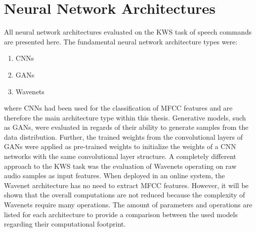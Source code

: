 
\section{Neural Network Architectures}\label{sec:nn_arch}
All neural network architectures evaluated on the KWS task of speech commands are presented here.
The fundamental neural network architecture types were:
\begin{enumerate}
	\item CNNs
	\item GANs
	\item Wavenets
\end{enumerate}
where CNNs had been used for the classification of MFCC features and are therefore the main architecture type within this thesis.
Generative models, such as GANs, were evaluated in regards of their ability to generate samples from the data distribution.
Further, the trained weights from the convolutional layers of GANs were applied as pre-trained weights to initialize the weights of a CNN networks with the same convolutional layer structure.
A completely different approach to the KWS task was the evaluation of Wavenets operating on raw audio samples as input features.
When deployed in an online system, the Wavenet architecture has no need to extract MFCC features.
However, it will be shown that the overall computations are not reduced because the complexity of Wavenets require many operations.
The amount of parameters and operations are listed for each architecture to provide a comparison between the used models regarding their computational footprint.



